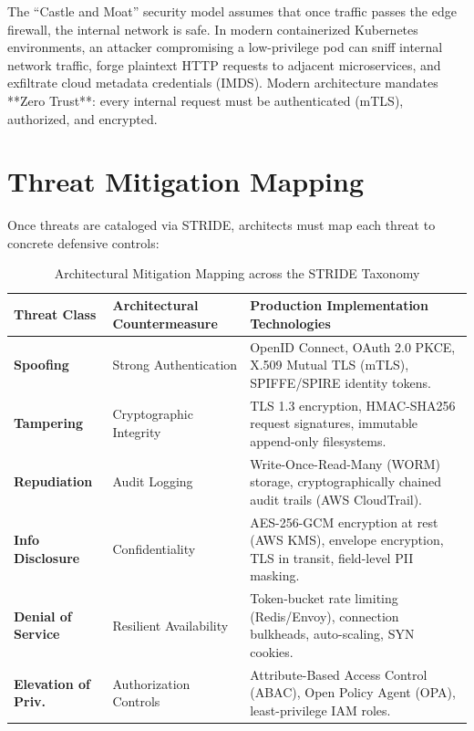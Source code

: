 \begin{commonmistakebox}
The ``Castle and Moat'' security model assumes that once traffic passes the edge firewall, the internal network is safe. In modern containerized Kubernetes environments, an attacker compromising a low-privilege pod can sniff internal network traffic, forge plaintext HTTP requests to adjacent microservices, and exfiltrate cloud metadata credentials (IMDS). Modern architecture mandates **Zero Trust**: every internal request must be authenticated (mTLS), authorized, and encrypted.
\end{commonmistakebox}

\section{Threat Mitigation Mapping}

Once threats are cataloged via STRIDE, architects must map each threat to concrete defensive controls:

\begin{table}[htbp]
\centering\small
\begin{tabular}{llp{7.5cm}}
\toprule
\textbf{Threat Class} & \textbf{Architectural Countermeasure} & \textbf{Production Implementation Technologies} \\
\midrule
\textbf{Spoofing} & Strong Authentication & OpenID Connect, OAuth 2.0 PKCE, X.509 Mutual TLS (mTLS), SPIFFE/SPIRE identity tokens. \\
\textbf{Tampering} & Cryptographic Integrity & TLS 1.3 encryption, HMAC-SHA256 request signatures, immutable append-only filesystems. \\
\textbf{Repudiation} & Audit Logging & Write-Once-Read-Many (WORM) storage, cryptographically chained audit trails (AWS CloudTrail). \\
\textbf{Info Disclosure} & Confidentiality & AES-256-GCM encryption at rest (AWS KMS), envelope encryption, TLS in transit, field-level PII masking. \\
\textbf{Denial of Service} & Resilient Availability & Token-bucket rate limiting (Redis/Envoy), connection bulkheads, auto-scaling, SYN cookies. \\
\textbf{Elevation of Priv.} & Authorization Controls & Attribute-Based Access Control (ABAC), Open Policy Agent (OPA), least-privilege IAM roles. \\
\bottomrule
\end{tabular}
\caption{Architectural Mitigation Mapping across the STRIDE Taxonomy}
\label{tab:mitigation-mapping}
\end{table}

